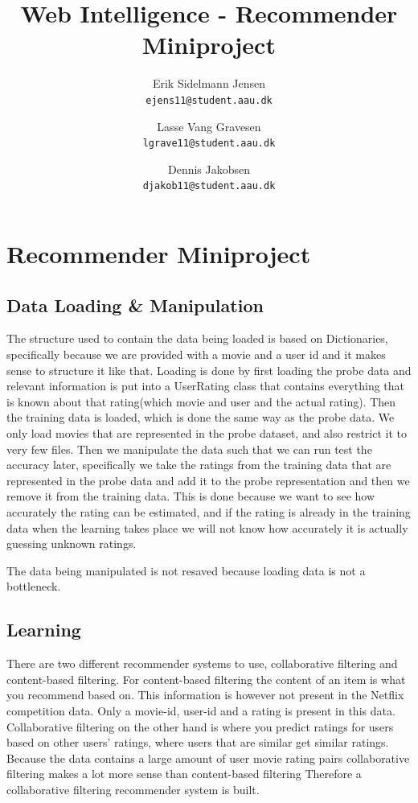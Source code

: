 

\author{
  Erik Sidelmann Jensen\\
  \texttt{ejens11@student.aau.dk}
  \and
  Lasse Vang Gravesen\\
  \texttt{lgrave11@student.aau.dk}
  \and
  Dennis Jakobsen\\
  \texttt{djakob11@student.aau.dk}  
}

\title{Web Intelligence - Recommender Miniproject}
\date{}


	\clearpage\maketitle
	\thispagestyle{empty}
	
	\chapter{Recommender Miniproject}
	\section{Data Loading \& Manipulation}
	The structure used to contain the data being loaded is based on Dictionaries, specifically because we are provided with a movie and a user id and it makes sense to structure it like that.
	Loading is done by first loading the probe data and relevant information is put into a UserRating class that contains everything that is known about that rating(which movie and user and the actual rating).
	Then the training data is loaded, which is done the same way as the probe data.
	We only load movies that are represented in the probe dataset, and also restrict it to very few files. 
	Then we manipulate the data such that we can run test the accuracy later, specifically we take the ratings from the training data that are represented in the probe data and add it to the probe representation and then we remove it from the training data. This is done because we want to see how accurately the rating can be estimated, and if the rating is already in the training data when the learning takes place we will not know how accurately it is actually guessing unknown ratings.
	
	The data being manipulated is not resaved because loading data is not a bottleneck.
	
	\section{Learning}
	There are two different recommender systems to use, collaborative filtering and content-based filtering. For content-based filtering the content of an item is what you recommend based on. This information is however not present in the Netflix competition data. Only a movie-id, user-id and a rating is present in this data.
	Collaborative filtering on the other hand is where you predict ratings for users based on other users' ratings, where users that are similar get similar ratings.
	Because the data contains a large amount of user movie rating pairs collaborative filtering makes a lot more sense than content-based filtering
	Therefore a collaborative filtering recommender system is built.
	
